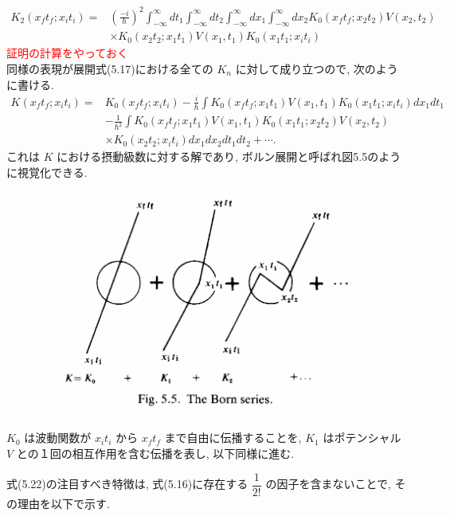 \documentclass{jsarticle}
\begin{document}
\begin{align*}
    K_{2}(x_{f}t_{f}; x_{i}t_{i}) = &\left( \frac{-i}{\hbar} \right)^2 \int_{-\infty}^{\infty} dt_1 \int_{-\infty}^{\infty} dt_2 \int_{-\infty}^{\infty} dx_1 \int_{-\infty}^{\infty}dx_2 K_{0}(x_{f}t_{f}; x_{2}t_{2})V(x_{2}, t_{2}) \\
    & \times K_{0}(x_{2}t_{2}; x_{1}t_{1})V(x_{1}, t_{1})K_{0}(x_{1}t_{1}; x_{i}t_{i}) \tag{5.22}
\end{align*}
\textcolor{red}{証明の計算をやっておく}\\
同様の表現が展開式(5.17)における全ての $K_n$ に対して成り立つので, 次のように書ける.
\begin{align*}
    K(x_f t_f; x_i t_i) = &K_0(x_f t_f; x_i t_i) - \frac{i}{\hbar} \int K_0(x_f t_f; x_1 t_1)V(x_1, t_1)K_0(x_1 t_1; x_i t_i)dx_1 dt_1\\
    & - \frac{1}{\hbar^2}\int K_0(x_f t_f; x_1 t_1)V(x_1, t_1)K_0(x_1 t_1; x_2 t_2)V(x_2, t_2)\\
    & \times K_0(x_2 t_2; x_i t_i)dx_1 dx_2 dt_1 dt_2 + \cdots. \tag{5.23}
\end{align*}
これは $K$ における摂動級数に対する解であり, ボルン展開と呼ばれ図5.5のように視覚化できる.
\begin{figure}[H]
    \centering
    \includegraphics[width=\textwidth]{figure/fig5-5.png}    
\end{figure}
$K_0$ は波動関数が $x_{i}t_{i}$ から $x_{f}t_{f}$ まで自由に伝播することを, $K_1$ はポテンシャル $V$ との１回の相互作用を含む伝播を表し, 以下同様に進む.\par
式(5.22)の注目すべき特徴は, 式(5.16)に存在する $\dfrac{1}{2!}$ の因子を含まないことで, その理由を以下で示す.\\
\end{document}
